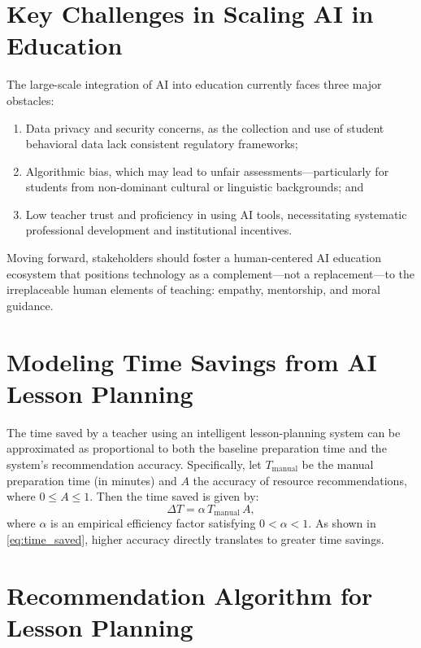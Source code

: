 \section{Key Challenges in Scaling AI in Education}

The large-scale integration of AI into education currently faces three major obstacles:

\begin{enumerate}
	\item Data privacy and security concerns, as the collection and use of student behavioral data lack consistent regulatory frameworks;
	\item Algorithmic bias, which may lead to unfair assessments—particularly for students from non-dominant cultural or linguistic backgrounds; and
	\item Low teacher trust and proficiency in using AI tools, necessitating systematic professional development and institutional incentives.
\end{enumerate}

Moving forward, stakeholders should foster a human-centered AI education ecosystem that positions technology as a complement—not a replacement—to the irreplaceable human elements of teaching: empathy, mentorship, and moral guidance.

\section{Modeling Time Savings from AI Lesson Planning}

The time saved by a teacher using an intelligent lesson-planning system can be approximated as proportional to both the baseline preparation time and the system’s recommendation accuracy. Specifically, let $T_{\text{manual}}$ be the manual preparation time (in minutes) and $A$ the accuracy of resource recommendations, where $0 \leq A \leq 1$. Then the time saved is given by:
\begin{equation}
	\Delta T = \alpha \, T_{\text{manual}} \, A,
	\label{eq:time_saved}
\end{equation}
where $\alpha$ is an empirical efficiency factor satisfying $0 < \alpha < 1$. As shown in \cref{eq:time_saved}, higher accuracy directly translates to greater time savings.

\section{Recommendation Algorithm for Lesson Planning}

